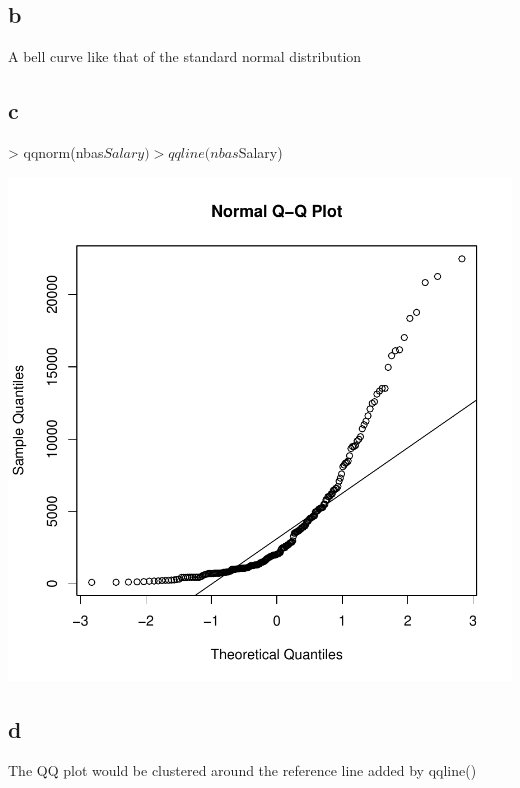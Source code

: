\documentclass{article}
\begin{document}
\subsection*{b}
A bell curve like that of the standard normal distribution

\subsection*{c}
\begin{Schunk}
\begin{Sinput}
> qqnorm(nbas$Salary)
> qqline(nbas$Salary)
\end{Sinput}
\end{Schunk}
\includegraphics{Assignment1A-003}

\subsection*{d}
The QQ plot would be clustered around the reference line added by qqline()
\end{document}
